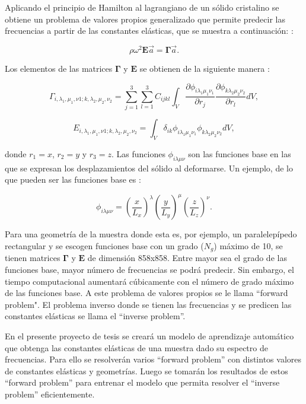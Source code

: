 \documentclass[12pt]{article}
\begin{document}
Aplicando el principio de Hamilton al lagrangiano de un sólido cristalino se obtiene un problema de valores propios generalizado que permite predecir las frecuencias a partir de las constantes elásticas, que se muestra a continuación: \cite{Leisure_1997}:

\begin{equation}
    \rho \omega^2 \bm{E} \vec{a} = \bm{\Gamma} \vec{a}. 
\end{equation}

Los elementos de las matrices $\bm{\Gamma}$ y $\bm{E}$ se obtienen de la siguiente manera \cite{Ohno}: 

\begin{equation}
    \Gamma_{i, \lambda_1, \mu_1,  \nu1; k, \lambda_2, \mu_2, \nu_2} = \sum_{j=1}^{3} \sum_{l=1}^{3} {C_{ijkl} \int_{V}{\frac{\partial \phi_{i \lambda_{1} \mu_1 \nu_1}}{\partial r_j} \frac{\partial \phi_{k \lambda_2 \mu_2 \nu_2}}{\partial r_l} dV}},
\end{equation}

\begin{equation}
    E_{i, \lambda_1, \mu_1,  \nu1; k, \lambda_2, \mu_2, \nu_2} = \int_{V}{\delta_{ik} \phi_{i \lambda_1 \mu_1 \nu_1}  \phi_{k \lambda_2 \mu_2 \nu_2} dV},
\end{equation}

donde $r_1 = x$, $r_2 = y$ y  $r_3 = z$. Las funciones $\phi_{i \lambda \mu \nu}$ son las funciones base en las que se expresan los desplazamientos del sólido al deformarse. Un ejemplo, de lo que pueden ser las funciones base es \cite{Demarest}: 

\begin{equation}
    \phi_{i \lambda \mu \nu} = \left(\frac{x}{L_x} \right)^{\lambda} \left(\frac{y}{L_y} \right)^{\mu} \left(\frac{z}{L_z} \right)^{\nu}.
\end{equation}

Para una geometría de la muestra donde esta es, por ejemplo, un paralelepípedo rectangular y se escogen funciones base con un grado ($N_g$) máximo de 10, se tienen matrices $\bm{\Gamma}$ y $\bm{E}$ de dimensión 858x858. Entre mayor sea el grado de las funciones base, mayor número de frecuencias se podrá predecir. Sin embargo, el tiempo computacional aumentará cúbicamente con el número de grado máximo de las funciones base. A este problema de valores propios se le llama ``forward problem". El problema inverso donde se tienen las frecuencias y se predicen las constantes elásticas se llama el ``inverse problem''.

En el presente proyecto de tesis se creará un modelo de aprendizaje automático que obtenga las constantes elásticas de una muestra dado su espectro de frecuencias. Para ello se resolverán varios ``forward problem'' con distintos valores de constantes elásticas y geometrías. Luego se tomarán los resultados de estos ``forward problem'' para entrenar el modelo que permita resolver el ``inverse problem'' eficientemente.
\end{document}
